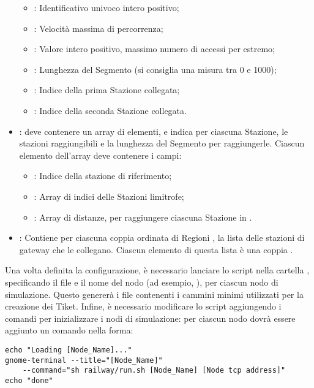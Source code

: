 \begin{itemize}
			\begin{itemize}
				\item {}: Identificativo univoco intero positivo;
				\item {}: Velocità massima di percorrenza;
				\item {}: Valore intero positivo, massimo numero di accessi per estremo;
				\item {}: Lunghezza del Segmento (si consiglia una misura tra 0 e 1000);
				\item {}: Indice della prima Stazione collegata;
				\item {}: Indice della seconda Stazione collegata.
			\end{itemize}
		\item {}: deve contenere un array  di elementi, e indica per ciascuna Stazione, le stazioni raggiungibili e la lunghezza del Segmento per raggiungerle. Ciascun elemento dell'array deve contenere i campi:
			\begin{itemize}
				\item {}: Indice della stazione di riferimento;
				\item {}: Array di indici delle Stazioni limitrofe;
				\item {}: Array di distanze, per raggiungere ciascuna Stazione in .
			\end{itemize}
		\item {}: Contiene per ciascuna coppia ordinata di Regioni , la lista delle stazioni di gateway che le collegano. Ciascun elemento di questa lista è una coppia . 
	\end{itemize}
	
	Una volta definita la configurazione, è necessario lanciare lo script  nella cartella , specificando il file  e il nome del nodo (ad esempio, ), per ciascun nodo di simulazione. Questo genererà i file  contenenti i cammini minimi utilizzati per la creazione dei Tiket.
	Infine, è necessario modificare lo script  aggiungendo i comandi per inizializzare i nodi di simulazione: per ciascun nodo dovrà essere aggiunto un comando nella forma:
	\begin{verbatim}
echo "Loading [Node_Name]..."
gnome-terminal --title="[Node_Name]"
    --command="sh railway/run.sh [Node_Name] [Node tcp address]"
echo "done"
	\end{verbatim}
	
